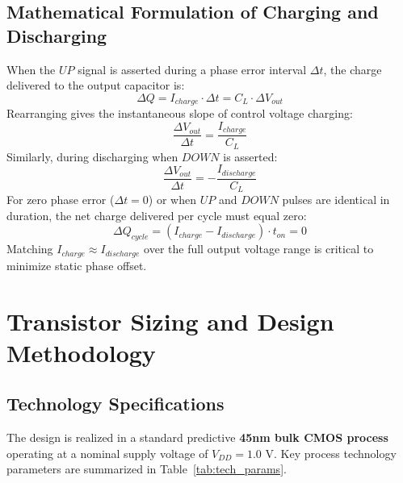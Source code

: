 \documentclass[11pt,a4paper]{report}
\begin{document}
\section{Mathematical Formulation of Charging and Discharging}
When the $UP$ signal is asserted during a phase error interval $\Delta t$, the charge delivered to the output capacitor is:
\begin{equation}
    \Delta Q = I_{charge} \cdot \Delta t = C_L \cdot \Delta V_{out}
\end{equation}
Rearranging gives the instantaneous slope of control voltage charging:
\begin{equation}
    \frac{\Delta V_{out}}{\Delta t} = \frac{I_{charge}}{C_L}
\end{equation}
Similarly, during discharging when $DOWN$ is asserted:
\begin{equation}
    \frac{\Delta V_{out}}{\Delta t} = -\frac{I_{discharge}}{C_L}
\end{equation}
For zero phase error ($\Delta t = 0$) or when $UP$ and $DOWN$ pulses are identical in duration, the net charge delivered per cycle must equal zero:
\begin{equation}
    \Delta Q_{cycle} = (I_{charge} - I_{discharge}) \cdot t_{on} = 0
\end{equation}
Matching $I_{charge} \approx I_{discharge}$ over the full output voltage range is critical to minimize static phase offset.

\newpage

\chapter{Transistor Sizing and Design Methodology}

\section{Technology Specifications}
The design is realized in a standard predictive \textbf{45nm bulk CMOS process} operating at a nominal supply voltage of $V_{DD} = 1.0\text{ V}$. Key process technology parameters are summarized in Table~\ref{tab:tech_params}.
\end{document}
